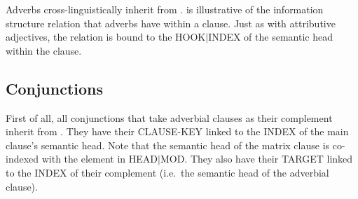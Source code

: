 Adverbs cross-linguistically inherit from .
 is illustrative of the information structure relation
that adverbs have within a clause. Just as with attributive
adjectives, the relation is bound to the HOOK{$\mid$}INDEX of the
semantic head within the clause.






\subsection{Conjunctions}
\label{10:sssec:conjunctions}














First of all, all conjunctions that take adverbial clauses as their
complement inherit from
. They have their CLAUSE-KEY linked to the INDEX of the main
clause's semantic head. Note that the semantic head of the matrix
clause is co-indexed with the element in HEAD{$\mid$}MOD.  They also
have their TARGET linked to the INDEX of their complement (i.e.\ the
semantic head of the adverbial clause).



